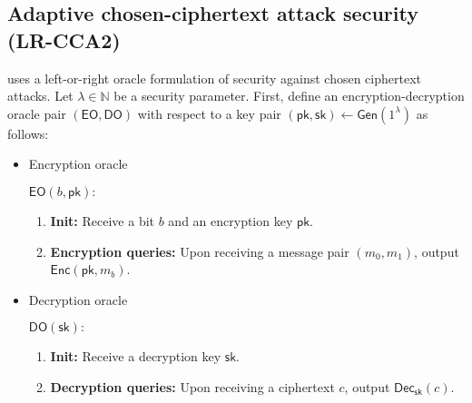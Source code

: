 \documentclass[11pt,letterpaper]{article}
\newcommand{\authnote}[2]{[{\color{red}\textbf{#1:}}~{\color{blue} #2}]}
\newcommand{\authnote}[2]{}
\newcommand{\megan}[1]{\authnote{Megan}{#1}}
\theoremstyle{plain} %
\theoremstyle{definition} %
\theoremstyle{remark} %
\newcommand{\eqdef}{\ {:=} \ }
\newcommand{\SecParam}{\lambda}
\newcommand{\Gen}{\mathsf{Gen}}
\newcommand{\Enc}{\mathsf{Enc}}
\newcommand{\OblivEnc}{\mathsf{OblivEnc}}
\newcommand{\Dec}{\mathsf{Dec}}
\newcommand{\EncKey}{\mathsf{pk}}
\newcommand{\DecKey}{\mathsf{sk}}
\newcommand{\ChallengerBit}{b}
\newcommand{\EncOracle}{\mathsf{EO}}
\newcommand{\DecOracle}{\mathsf{DO}}
\newcommand{\Msg}{m}
\newcommand{\Ciphertext}{c}
\newcommand{\Rand}{r}
\newcommand{\Distribution}{\mathcal{D}}
\newcommand{\RandSpace}{\mathcal{R}}
\newcommand{\Adversary}{{\mathsf{Adv}}} %
\newcommand{\Naturals}{\mathbb{N}}
\begin{document}
%
%

\subsection{Adaptive chosen-ciphertext attack security (LR-CCA2)}
\label{sec:lr-cca2}
\cite{CanettiF01} uses a left-or-right oracle formulation of security against chosen ciphertext attacks. Let $\SecParam\in\Naturals$ be a security parameter. First, define an encryption-decryption oracle pair $(\EncOracle, \DecOracle)$ with respect to a key pair $(\EncKey,\DecKey) \gets \Gen(1^\SecParam)$ as follows:
\begin{itemize}
	\item Encryption oracle

	\begin{minipage}{0.9\textwidth}
	$\EncOracle(\ChallengerBit,\EncKey):$
	\begin{enumerate}[nolistsep]
		\item \textbf{Init:} Receive a bit $\ChallengerBit$ and an encryption key $\EncKey$.
		\item \textbf{Encryption queries:} Upon receiving a message pair $(\Msg_0, \Msg_1)$, output $\Enc(\EncKey,\Msg_{\ChallengerBit})$.
	\end{enumerate}
	\end{minipage}

	\item Decryption oracle

	\begin{minipage}{0.9\textwidth}
	$\DecOracle(\DecKey):$
	\begin{enumerate}[nolistsep]
		\item \textbf{Init:} Receive a decryption key $\DecKey$.
		\item \textbf{Decryption queries:} Upon receiving a ciphertext $\Ciphertext$, output $\Dec_{\DecKey}(\Ciphertext)$.
	\end{enumerate}
	\end{minipage}
\end{itemize}
\end{document}
